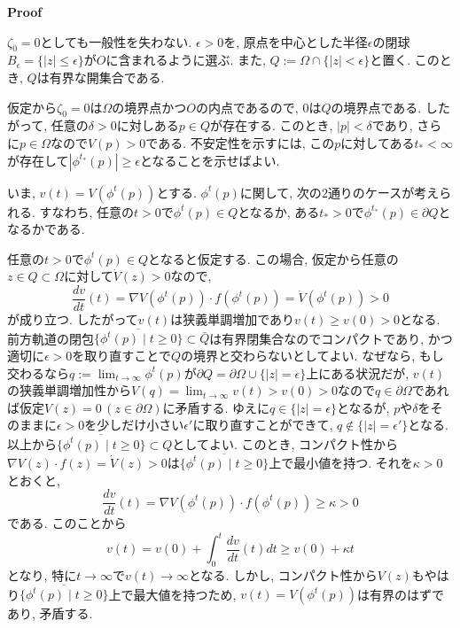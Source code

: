 \documentclass[a4paper]{ujarticle}
\makeatletter
\theoremstyle{definition}
\renewenvironment{proof}[1][Proof]{\par
  \pushQED{\qed}%
  \normalfont \topsep6\p@\@plus6\p@\relax
  \trivlist
  \item\relax
  {\bfseries
  #1\@addpunct{.}}\hspace\labelsep\ignorespaces
}{%
  \popQED\endtrivlist\@endpefalse
}
\makeatother
\begin{document}
    \begin{proof}
        $\zeta_0 = 0$としても一般性を失わない.
        $\epsilon > 0$を, 原点を中心とした半径$\epsilon$の閉球$B_{\epsilon} = \{|z| \leq \epsilon\}$が$O$に含まれるように選ぶ.
        また, $Q := \Omega \cap \{|z| < \epsilon\}$と置く. このとき, $Q$は有界な開集合である.

        仮定から$\zeta_0 = 0$は$\Omega$の境界点かつ$O$の内点であるので, $0$は$Q$の境界点である.
        したがって, 任意の$\delta > 0$に対しある$p \in Q$が存在する. 
        このとき, $|p| < \delta$であり, さらに$p \in \Omega$なので$V(p) > 0$である.
        不安定性を示すには, この$p$に対してある$t_{*} < \infty$が存在して$|\phi^{t_{*}}(p)| \geq \epsilon$となることを示せばよい.

        いま, $v(t) = V(\phi^{t}(p))$とする. 
        $\phi^{t}(p)$に関して, 次の$2$通りのケースが考えられる. 
        すなわち, 任意の$t > 0$で$\phi^{t}(p) \in Q$となるか, ある$t_{*} > 0$で$\phi^{t_{*}}(p) \in \partial Q$となるかである.

        任意の$t > 0$で$\phi^{t}(p) \in Q$となると仮定する.
        この場合, 仮定から任意の$z \in Q \subset \Omega$に対して$\dot{V}(z) > 0$なので,
        \[
            \frac{dv}{dt}(t) = \nabla V(\phi^{t}(p)) \cdot f(\phi^{t}(p)) = \dot{V}(\phi^{t}(p)) > 0
        \]
        が成り立つ. したがって$v(t)$は狭義単調増加であり$v(t) \geq v(0) > 0$となる.
        前方軌道の閉包$\overline{\{\phi^{t}(p) \mid t \geq 0\} }\subset \bar{Q}$は有界閉集合なのでコンパクトであり, 
        かつ適切に$\epsilon > 0$を取り直すことで$Q$の境界と交わらないとしてよい.
        なぜなら, もし交わるなら$\displaystyle q := \lim_{t \rightarrow \infty} \phi^{t}(p)$が$\partial Q = \partial \Omega \cup \{|z| = \epsilon \}$上にある状況だが,
        $v(t)$の狭義単調増加性から$V(q) = \lim_{t \rightarrow \infty} v(t) > v(0) > 0$なので$q \in \partial \Omega$であれば仮定$V(z) = 0 \, (z \in \partial \Omega)$に矛盾する.
        ゆえに$q \in \{|z| = \epsilon \}$となるが,
        $p$や$\delta$をそのままに$\epsilon > 0$を少しだけ小さい$\epsilon'$に取り直すことができて,
        $q \notin \{|z| = \epsilon' \}$となる. 以上から$\overline{ \{\phi^{t}(p) \mid t \geq 0\}} \subset Q$としてよい.
        このとき, コンパクト性から$\displaystyle \nabla V(z) \cdot f(z) = \dot{V}(z) > 0$は$\overline{ \{\phi^{t}(p) \mid t \geq 0\}}$上で最小値を持つ.
        それを$\kappa > 0$とおくと, 
        \[
            \frac{dv}{dt}(t) = \nabla V(\phi^{t}(p)) \cdot f(\phi^{t}(p)) \geq \kappa > 0
        \]
        である. このことから
        \[
            v(t) = v(0) + \int^{t}_{0} \frac{dv}{dt}(t) dt \geq v(0) + \kappa t
        \]
        となり, 特に$t \rightarrow \infty$で$v(t) \rightarrow \infty$となる. 
        しかし, コンパクト性から$V(z)$もやはり$\overline{ \{\phi^{t}(p) \mid t \geq 0\}}$上で最大値を持つため, $v(t) = V(\phi^{t}(p))$は有界のはずであり, 
        矛盾する. 


\end{proof}
\end{document}
